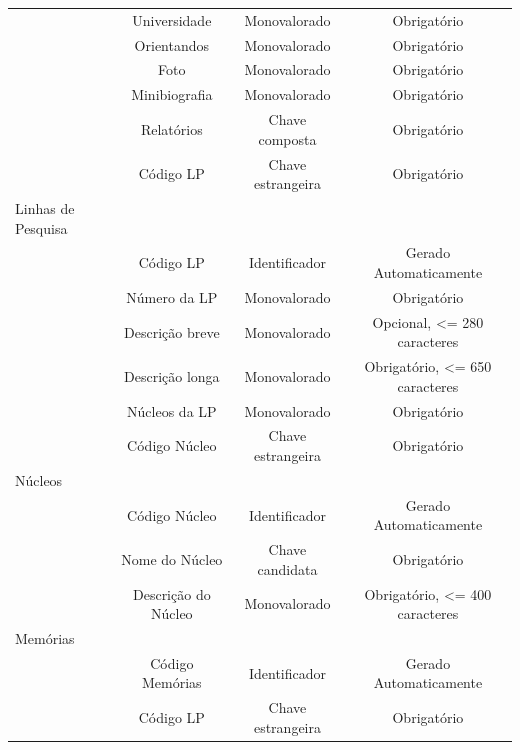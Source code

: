 \documentclass[11pt]{../../classes/ifscarticle}
\begin{document}
\begin{table}[h]
\begin{tabular}{l|c|c|c|}
                  & Universidade        & Monovalorado      & Obrigatório                                          \\
                  & Orientandos         & Monovalorado      & Obrigatório                                          \\
                  & Foto                & Monovalorado      & Obrigatório                                          \\
                  & Minibiografia       & Monovalorado      & Obrigatório                                          \\
                  & Relatórios          & Chave composta    & Obrigatório                                          \\
                  & Código LP           & Chave estrangeira & Obrigatório                                          \\
    \hline
    Linhas de Pesquisa \\
                  & Código LP       & Identificador     & Gerado Automaticamente         \\
                  & Número da LP    & Monovalorado      & Obrigatório                    \\
                  & Descrição breve & Monovalorado      & Opcional, <= 280 caracteres    \\
                  & Descrição longa & Monovalorado      & Obrigatório, <= 650 caracteres \\
                  & Núcleos da LP   & Monovalorado      & Obrigatório                    \\
                  & Código Núcleo   & Chave estrangeira & Obrigatório                    \\
    \hline
    Núcleos \\
                  & Código Núcleo       & Identificador     & Gerado Automaticamente         \\
                  & Nome do Núcleo      & Chave candidata   & Obrigatório                    \\
                  & Descrição do Núcleo & Monovalorado      & Obrigatório, <= 400 caracteres \\
    \hline
    Memórias \\
                  & Código Memórias     & Identificador     & Gerado Automaticamente \\
                  & Código LP           & Chave estrangeira & Obrigatório            \\

\end{tabular}
\end{table}
\end{document}
